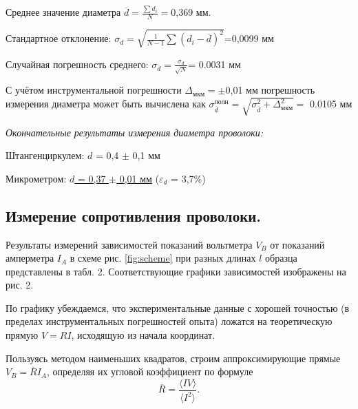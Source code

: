 \documentclass[12pt,a4paper]{article}
\begin{document}
Среднее значение диаметра $\overline{d}=\frac{\sum d_i}{N}=$0,369 мм.

Стандартное отклонение: $\sigma{_d} = \sqrt{\frac{1}{N-1}\sum (d_i-\overline{d})^{2}}$=0,0099 мм

Случайная погрешность среднего: $\sigma _{\overline{d}} = \frac{\sigma _d}{\sqrt{N}}$= 0.0031 мм

С учётом инструментальной погрешности $\Delta _{мкм} = \pm$0,01 мм погрешность измерения диаметра может быть вычислена как $\sigma ^{полн} _{\overline{d}} = \sqrt{ \sigma ^{2} _{\overline{d}} + \Delta ^2 _{мкм}} = $ 0.0105 мм

\textit{Окончательные результаты измерения диаметра проволоки:}
\begin{center}
{ Штангенциркулем: $d$ = 0,4 $\pm$ 0,1 мм}

{ Микрометром: \underline{$d$ = 0,37 $\pm$ 0,01 мм} ($\varepsilon _d$ = 3,7\%)}
\end{center}
\subsection{ Измерение сопротивления проволоки.}

Результаты измерений зависимостей показаний вольтметра $V_B$ от показаний амперметра $I_A$ в схеме рис. \ref{fig:scheme} при разных длинах $l$ образца представлены в табл. 2. Соответствующие графики зависимостей изображены на рис. 2.

По графику убеждаемся, что экспериментальные данные с хорошей точностью (в пределах
инструментальных погрешностей опыта) ложатся на теоретическую прямую $V=RI$, исходящую из начала координат.

Пользуясь методом наименьших квадратов, строим аппроксимирующие прямые $V_B=\overline{R}I_A$,
определяя их угловой коэффициент по формуле
\begin{equation}
    \overline{R}=\frac{\langle IV \rangle}{\langle I^2 \rangle}.
\end{equation}
\end{document}
